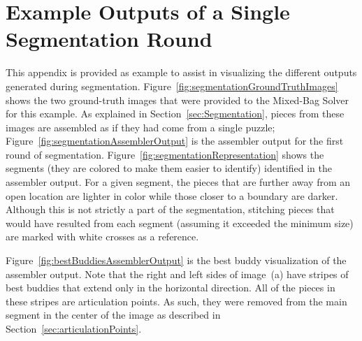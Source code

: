 \chapter{Example Outputs of a Single Segmentation Round\label{app:segmentedOutput}}

This appendix is provided as example to assist in visualizing the different outputs generated during segmentation.  Figure~\ref{fig:segmentationGroundTruthImages} shows the two ground-truth images that were provided to the Mixed-Bag Solver for this example.  As explained in Section~\ref{sec:Segmentation}, pieces from these images are assembled as if they had come from a single puzzle;  Figure~\ref{fig:segmentationAssemblerOutput} is the assembler output for the first round of segmentation.  Figure~\ref{fig:segmentationRepresentation} shows the segments (they are colored to make them easier to identify) identified in the assembler output.  For a given segment, the pieces that are further away from an open location are lighter in color while those closer to a boundary are darker.  Although this is not strictly a part of the segmentation, stitching pieces that would have resulted from each segment (assuming it exceeded the minimum size) are marked with white crosses as a reference.

Figure~\ref{fig:bestBuddiesAssemblerOutput} is the best buddy visualization of the assembler output.  Note that the right and left sides of image~(a) have stripes of best buddies that extend only in the horizontal direction.  All of the pieces in these stripes are articulation points.  As such, they were removed from the main segment in the center of the image as described in Section~\ref{sec:articulationPoints}.

